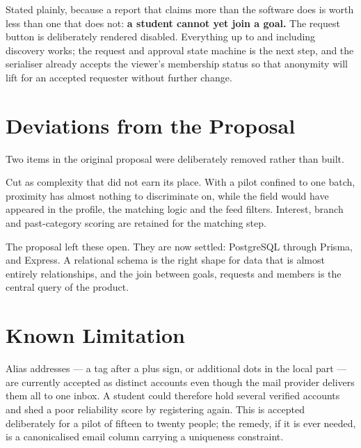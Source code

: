 \documentclass[twoside,12pt]{tietreport}
\begin{document}
Stated plainly, because a report that claims more than the software does is worth
less than one that does not: \textbf{a student cannot yet join a goal.} The
request button is deliberately rendered disabled. Everything up to and including
discovery works; the request and approval state machine is the next step, and the
serialiser already accepts the viewer's membership status so that anonymity will
lift for an accepted requester without further change.

\section{Deviations from the Proposal}

Two items in the original proposal were deliberately removed rather than built.

\begin{description}[leftmargin=0.8cm,style=nextline]
  \item[Hostel block and proximity-based matching.]
    Cut as complexity that did not earn its place. With a pilot confined to one
    batch, proximity has almost nothing to discriminate on, while the field would
    have appeared in the profile, the matching logic and the feed filters. Interest,
    branch and past-category scoring are retained for the matching step.

  \item[The choice between MongoDB and PostgreSQL, and between Express and NestJS.]
    The proposal left these open. They are now settled: PostgreSQL through Prisma,
    and Express. A relational schema is the right shape for data that is almost
    entirely relationships, and the join between goals, requests and members is
    the central query of the product.
\end{description}

\section{Known Limitation}

Alias addresses --- a tag after a plus sign, or additional dots in the local part
--- are currently accepted as distinct accounts even though the mail provider
delivers them all to one inbox. A student could therefore hold several verified
accounts and shed a poor reliability score by registering again. This is accepted
deliberately for a pilot of fifteen to twenty people; the remedy, if it is ever
needed, is a canonicalised email column carrying a uniqueness constraint.
\end{document}
